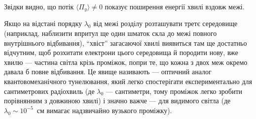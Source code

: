 Звідки видно, що потік $\langle\Pi_y\rangle\ne0$ показує поширення енергії хвилі вздовж межі.


\begin{Attention}
Якщо на відстані порядку $\lambda_0$ від межі розділу розташувати третє середовище (наприклад, наблизити впритул ще один шматок скла до межі повного внутрішнього відбивання), \enquote{хвіст} загасаючої хвилі виявиться там ще достатньо відчутним, щоб розхитати електрони цього середовища й породити нову, вже  хвилю --- частина світла  крізь проміжок, попри те, що кожна з двох меж окремо давала б повне відбивання. Це явище називають  --- оптичний аналог квантовомеханічного тунелювання, який легко спостерігати експериментально для сантиметрових радіохвиль (де $\lambda_0$ --- сантиметри, тому проміжок легко зробити порівнянним з довжиною хвилі) і значно важче --- для видимого світла (де $\lambda_0\sim10^{-5}$~см вимагає надзвичайно вузького проміжку).
\end{Attention}

